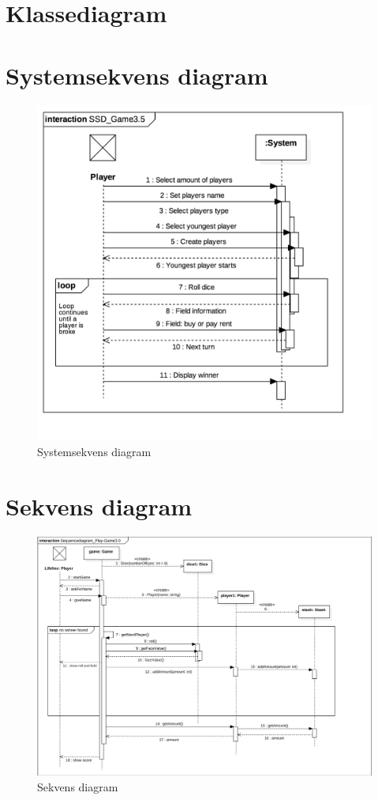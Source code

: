 \pagebreak

\section{Klassediagram}

\pagebreak

\section{Systemsekvens diagram}
\begin{figure}[H]
    \begin{center}
        \includegraphics[width=\columnwidth]{graphics/domain/SSD_Game35.png}
        \caption{Systemsekvens diagram}
        \label{fig:systemsekvens_diagram}
    \end{center}
\end{figure}

\section{Sekvens diagram}
\begin{figure}[H]
    \begin{center}
        \includegraphics[width=\columnwidth]{graphics/domain/SD_Game3.png}
        \caption{Sekvens diagram}
        \label{fig:sekvens_diagram}
    \end{center}
\end{figure}